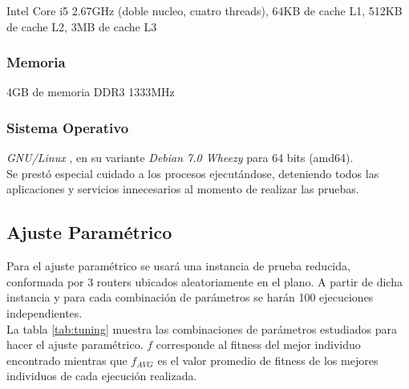 \documentclass[journal]{IEEEtran}
\begin{document}
Intel Core i5 2.67GHz (doble nucleo, cuatro threads), 64KB de cache L1, 512KB de cache L2, 3MB de cache L3\\

\subsubsection{Memoria}

4GB de memoria DDR3 1333MHz\\

\subsubsection{Sistema Operativo}

\emph{GNU/Linux} \cite{gnu} \cite{linux}, en su variante \emph{Debian 7.0 Wheezy} \cite{debian:stable} para 64 bits (amd64).\\

Se prestó especial cuidado a los procesos ejecutándose, deteniendo todos las aplicaciones y servicios innecesarios al momento de realizar las pruebas.

\subsection{Ajuste Paramétrico}

Para el ajuste paramétrico se usará una instancia de prueba reducida, conformada por 3 routers ubicados aleatoriamente en el plano. A partir de dicha instancia y para cada combinación de parámetros se harán 100 ejecuciones independientes.\\

La tabla \ref{tab:tuning} muestra las combinaciones de parámetros estudiados para hacer el ajuste paramétrico. $f$ corresponde al fitness del mejor individuo encontrado mientras que $f_{AVG}$ es el valor promedio de fitness de los mejores individuos de cada ejecución realizada.
\end{document}
